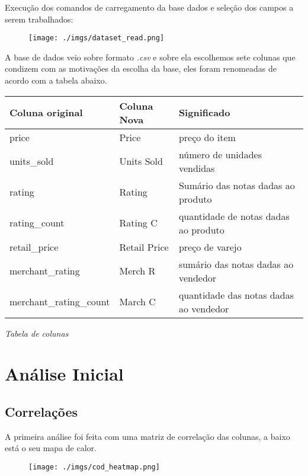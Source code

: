 \documentclass[12pt, a4paper]{article}
\begin{document}
Execução dos comandos de carregamento da base dados e seleção
dos campos a serem trabalhados:

\FloatBarrier
\begin{figure}[h]
\texttt{[image: ./imgs/dataset\_read.png]}
\end{figure}
\FloatBarrier 

A base de dados veio sobre formato \emph{.csv} e sobre ela escolhemos sete colunas que condizem com as motivações da escolha da base, eles foram renomeadas de acordo com a tabela abaixo. \\


\begin{tabularx}{0.8\textwidth} { 
  | >{\centering\arraybackslash}X 
  | >{\centering\arraybackslash}X 
  | >{\centering\arraybackslash}X | }
 \hline
 Coluna original & Coluna Nova & Significado \\
 \hline
  price & Price & preço do item\\ \hline
  units\_sold & Units Sold & número de unidades vendidas\\ \hline
  rating & Rating & Sumário das notas dadas ao produto \\ \hline
  rating\_count & Rating C & quantidade de notas dadas ao produto \\ \hline
  retail\_price & Retail Price & preço de varejo \\ \hline
  merchant\_rating & Merch R & sumário das notas dadas ao vendedor\\ \hline
  merchant\_rating\_count & March C & quantidade das notas dadas ao vendedor\\ \hline
\end{tabularx} 
\begin{center}
	\emph{Tabela de colunas}
\end{center}

\section{Análise Inicial}

\subsection{Correlações}

A primeira análise foi feita com uma matriz de correlação das colunas, a baixo está o seu mapa de calor.

\FloatBarrier
\begin{figure}[h]
\texttt{[image: ./imgs/cod\_heatmap.png]}
\end{figure}
\FloatBarrier 
\end{document}
